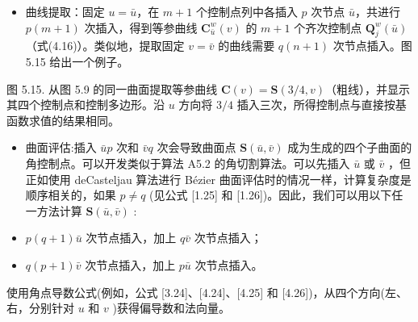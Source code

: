 \documentclass[../main.tex]{subfiles}
\begin{document}
\begin{itemize}
\item 曲线提取：固定 \(u=\bar u\)，在 \(m+1\) 个控制点列中各插入 \(p\) 次节点 \(\bar u\)，共进行 \(p(m+1)\) 次插入，得到等参曲线 \(\mathbf C_{\bar u}^{w}(v)\) 的 \(m+1\) 个齐次控制点 \(\mathbf Q_j^w(\bar u)\)（式(4.16)）。类似地，提取固定 \(v=\bar v\) 的曲线需要 \(q(n+1)\) 次节点插入。图 5.15 给出一个例子。
\end{itemize}

\begin{center}
\begin{minipage}{18cm}
\vspace*{.6\baselineskip}
\centering
{}
\par\smallskip
图 5.15. 从图 5.9 的同一曲面提取等参曲线 \(\mathbf C(v)=\mathbf S(3/4,v)\)（粗线），并显示其四个控制点和控制多边形。沿 \(u\) 方向将 \(3/4\) 插入三次，所得控制点与直接按基函数求值的结果相同。
\end{minipage}
\end{center}

\begin{itemize}
\item 曲面评估:插入 \(\bar{u}p\) 次和 \(\bar{v}q\) 次会导致曲面点 \(\mathbf{S}\left( {\bar{u},\bar{v}}\right)\) 成为生成的四个子曲面的角控制点。可以开发类似于算法 A5.2 的角切割算法。可以先插入 \(\bar{u}\) 或 \(\bar{v}\) ，但正如使用 deCasteljau 算法进行 Bézier 曲面评估时的情况一样，计算复杂度是顺序相关的，如果 \(p \neq  q\) (见公式 [1.25] 和 [1.26])。因此，我们可以用以下任一方法计算 \(\mathbf{S}\left( {\bar{u},\bar{v}}\right)\) :
\end{itemize}

\begin{itemize}
\item \(p\left( {q + 1}\right) \bar{u}\) 次节点插入，加上 \(q\bar{v}\) 次节点插入；
\end{itemize}

\begin{itemize}
\item \(q\left( {p + 1}\right) \bar{v}\) 次节点插入，加上 \(p\bar{u}\) 次节点插入。
\end{itemize}

使用角点导数公式(例如，公式 [3.24]、[4.24]、[4.25] 和 [4.26])，从四个方向(左、右，分别针对 \(u\) 和 \(v\) )获得偏导数和法向量。
\end{document}
